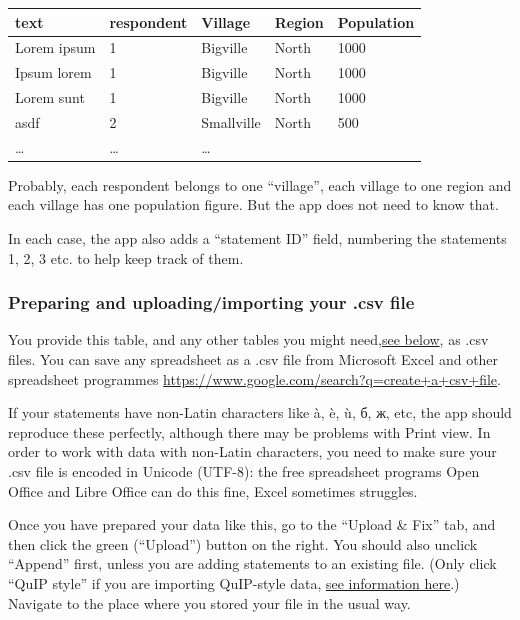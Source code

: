 \documentclass[
]{book}
\begin{document}
\begin{longtable}[]{@{}lllll@{}}
\toprule
\textbf{text} & \textbf{respondent} & \textbf{Village} & \textbf{Region} & \textbf{Population}\tabularnewline
\midrule
\endhead
Lorem ipsum & 1 & Bigville & North & 1000\tabularnewline
Ipsum lorem & 1 & Bigville & North & 1000\tabularnewline
Lorem sunt & 1 & Bigville & North & 1000\tabularnewline
asdf & 2 & Smallville & North & 500\tabularnewline
\ldots{} & \ldots{} & \ldots{} & &\tabularnewline
\bottomrule
\end{longtable}

Probably, each respondent belongs to one ``village'', each village to one region and each village has one population figure. But the app does not need to know that.

In each case, the app also adds a ``statement ID'' field, numbering the statements 1, 2, 3 etc. to help keep track of them.

\hypertarget{preparing-and-uploadingimporting-your-.csv-file}{%
\subsubsection{Preparing and uploading/importing your .csv file}\label{preparing-and-uploadingimporting-your-.csv-file}}

You provide this table, and any other tables you might need,\protect\hyperlink{viewing-and-manually-editing-your-data}{see below}, as .csv files. You can save any spreadsheet as a .csv file from Microsoft Excel and other spreadsheet programmes \url{https://www.google.com/search?q=create+a+csv+file}.

If your statements have non-Latin characters like à, è, ù, б, ж, etc, the app should reproduce these perfectly, although there may be problems with Print view. In order to work with data with non-Latin characters, you need to make sure your .csv file is encoded in Unicode (UTF-8): the free spreadsheet programs Open Office and Libre Office can do this fine, Excel sometimes struggles.

Once you have prepared your data like this, go to the ``Upload \& Fix'' tab, and then click the green (``Upload'') button on the right. You should also unclick ``Append'' first, unless you are adding statements to an existing file. (Only click ``QuIP style'' if you are importing QuIP-style data, \protect\hyperlink{quip-specific-importing-from-a-quip-spreadsheet}{see information here}.) Navigate to the place where you stored your file in the usual way.
\end{document}
